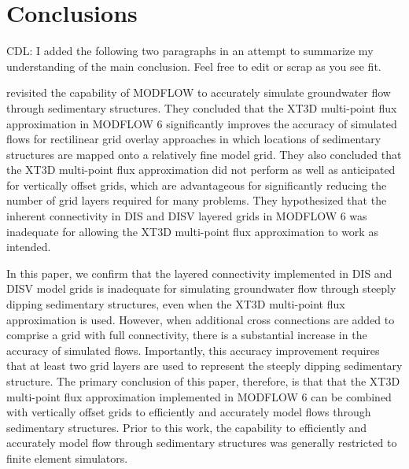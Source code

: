 \documentclass{article}
\begin{document}
\section{Conclusions}

 {\color{red} CDL: I added the following two paragraphs in an attempt to summarize my understanding of the main conclusion.  Feel free to edit or scrap as you see fit.}

\cite{bardot2022} revisited the capability of MODFLOW to accurately simulate groundwater flow through sedimentary structures.  They concluded that the XT3D multi-point flux approximation in MODFLOW 6 significantly improves the accuracy of simulated flows for rectilinear grid overlay approaches in which locations of sedimentary structures are mapped onto a relatively fine model grid.  They also concluded that the XT3D multi-point flux approximation did not perform as well as anticipated for vertically offset grids, which are advantageous for significantly reducing the number of grid layers required for many problems.  They hypothesized that the inherent connectivity in DIS and DISV layered grids in MODFLOW 6 was inadequate for allowing the XT3D multi-point flux approximation to work as intended.

In this paper, we confirm that the layered connectivity implemented in DIS and DISV model grids is inadequate for simulating groundwater flow through steeply dipping sedimentary structures, even when the XT3D multi-point flux approximation is used.  However, when additional cross connections are added to comprise a grid with full connectivity, there is a substantial increase in the accuracy of simulated flows.  Importantly, this accuracy improvement requires that at least two grid layers are used to represent the steeply dipping sedimentary structure.  The primary conclusion of this paper, therefore, is that that the XT3D multi-point flux approximation implemented in MODFLOW 6 can be combined with vertically offset grids to efficiently and accurately model flows through sedimentary structures.  Prior to this work, the capability to efficiently and accurately model flow through sedimentary structures was generally restricted to finite element simulators.
\end{document}
